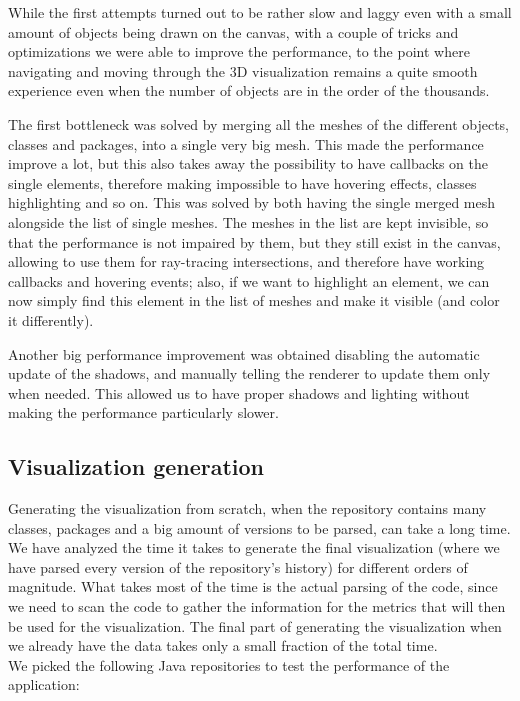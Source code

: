 \documentclass[]{usiinfbachelorproject}
\begin{document}
While the first attempts turned out to be rather slow and laggy even with a small amount of objects being drawn on the canvas, with a couple of tricks and optimizations we were able to improve the performance, to the point where navigating and moving through the 3D visualization remains a quite smooth experience even when the number of objects are in the order of the thousands.

The first bottleneck was solved by merging all the meshes of the different objects, classes and packages, into a single very big mesh. This made the performance improve a lot, but this also takes away the possibility to have callbacks on the single elements, therefore making impossible to have hovering effects, classes highlighting and so on. This was solved by both having the single merged mesh alongside the list of single meshes. The meshes in the list are kept invisible, so that the performance is not impaired by them, but they still exist in the canvas, allowing to use them for ray-tracing intersections, and therefore have working callbacks and hovering events; also, if we want to highlight an element, we can now simply find this element in the list of meshes and make it visible (and color it differently).

Another big performance improvement was obtained disabling the automatic update of the shadows, and manually telling the renderer to update them only when needed. This allowed us to have proper shadows and lighting without making the performance particularly slower.

\subsection{Visualization generation} \label{Visualization generation}

Generating the visualization from scratch, when the repository contains many classes, packages and a big amount of versions to be parsed, can take a long time. We have analyzed the time it takes to generate the final visualization (where we have parsed every version of the repository's history) for different orders of magnitude. What takes most of the time is the actual parsing of the code, since we need to scan the code to gather the information for the metrics that will then be used for the visualization. The final part of generating the visualization when we already have the data takes only a small fraction of the total time.\\

We picked the following Java repositories to test the performance of the application:
\end{document}
